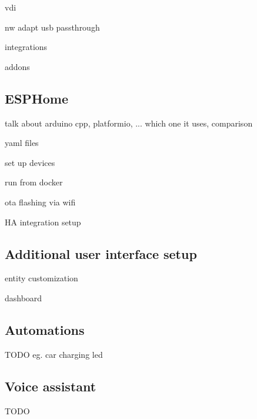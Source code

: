 vdi

nw adapt usb passthrough

integrations

addons

\subsection{ESPHome}

talk about arduino cpp, platformio, ... which one it uses, comparison

yaml files

set up devices

run from docker

ota flashing via wifi

HA integration setup

\subsection{Additional user interface setup}

entity customization

dashboard

\subsection{Automations}

TODO eg. car charging led

\subsection{Voice assistant}

TODO
